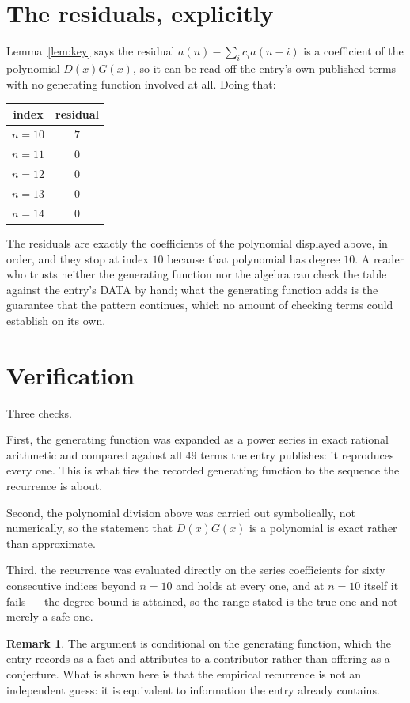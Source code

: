 \documentclass[11pt,a4paper]{article}
\theoremstyle{plain}
\theoremstyle{definition}
\newtheorem{remark}[theorem]{Remark}
\begin{document}
\section{The residuals, explicitly}

Lemma~\ref{lem:key} says the residual $a(n)-\sum_ic_ia(n-i)$ is a coefficient of the
polynomial $D(x)G(x)$, so it can be read off the entry's own published terms with no
generating function involved at all. Doing that:
\begin{center}
\begin{tabular}{cc}
index & residual \\ \hline
$n=10$ & $7$ \\
$n=11$ & $0$ \\
$n=12$ & $0$ \\
$n=13$ & $0$ \\
$n=14$ & $0$
\end{tabular}
\end{center}
The residuals are exactly the coefficients of the polynomial displayed above, in order, and
they stop at index $10$ because that polynomial has degree $10$. A reader who trusts
neither the generating function nor the algebra can check the table against the entry's DATA
by hand; what the generating function adds is the guarantee that the pattern continues, which
no amount of checking terms could establish on its own.

\section{Verification}

Three checks.

First, the generating function was expanded as a power series in exact rational arithmetic and
compared against all $49$ terms the entry publishes: it reproduces every one. This is
what ties the recorded generating function to the sequence the recurrence is about.

Second, the polynomial division above was carried out symbolically, not numerically, so the
statement that $D(x)G(x)$ is a polynomial is exact rather than approximate.

Third, the recurrence was evaluated directly on the series coefficients for sixty consecutive
indices beyond $n=10$ and holds at every one, and at $n=10$ itself it fails --- the
degree bound is attained, so the range stated is the true one and not merely a safe one.

\begin{remark}
The argument is conditional on the generating function, which the entry records as a fact and
attributes to a contributor rather than offering as a conjecture. What is shown here is that
the empirical recurrence is not an independent guess: it is equivalent to information the
entry already contains.
\end{remark}
\end{document}
